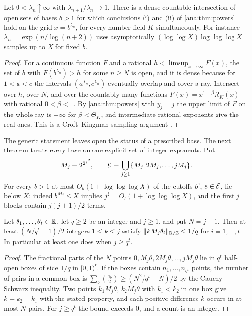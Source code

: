 \begin{proposition}\label{ana:prop:generic}
Let $0<\lambda_n\uparrow\infty$ with $\lambda_{n+1}/\lambda_n\to1$. There is a dense countable
intersection of open sets of bases $b>1$ for which conclusions \textup{(i)} and
\textup{(ii)} of \cref{ana:thm:powers} hold on the grid $x=b^{\lambda_n}$, for every number
field $K$ simultaneously. For instance $\lambda_n=\exp(n/\log(n+2))$ uses asymptotically
$(\log\log X)\log\log\log X$ samples up to $X$ for fixed $b$.
\end{proposition}

\begin{proof}
For a continuous function $F$ and a rational $h<\limsup_{x\to\infty}F(x)$, the set of $b$ with
$F(b^{\lambda_n})>h$ for some $n\ge N$ is open, and it is dense because for $1<a<c$ the
intervals $(a^{\lambda_n},c^{\lambda_n})$ eventually overlap and cover a ray. Intersect over
$h$, over $N$, and over the countably many functions $F(x)=x^{1-\beta}R_K(x)$ with rational
$0<\beta<1$. By \cref{ana:thm:powers} with $y_j=j$ the upper limit of $F$ on the whole ray is
$+\infty$ for $\beta<\Theta_K$, and intermediate rational exponents give the real ones. This
is a Croft--Kingman sampling argument \cite{BinghamOstaszewskiKingman}.
\end{proof}

The generic statement leaves open the status of a prescribed base. The next theorem treats
every base on one explicit set of integer exponents. Put
\[
 M_j=2^{2^{j^2}},\qquad\mathcal{E}=\bigcup_{j\ge1}\{M_j,2M_j,\dots,jM_j\}.
\]
For every $b>1$ at most $O_b(1+\log\log\log X)$ of the cutoffs $b^e$, $e\in\mathcal{E}$, lie below
$X$: indeed $b^{M_j}\le X$ implies $j^2=O_b(1+\log\log\log X)$, and the first $j$ blocks
contain $j(j+1)/2$ terms.

\begin{lemma}\label{ana:lem:boxcount}
Let $\theta_1,\dots,\theta_t\in\mathbb{R}$, let $q\ge2$ be an integer and $j\ge1$, and put $N=j+1$.
Then at least $(N/q^t-1)/2$ integers $1\le k\le j$ satisfy $\lVert kM_j\theta_i\rVert_{\mathbb{R}/\mathbb{Z}}\le1/q$ for
$i=1,\dots,t$. In particular at least one does when $j\ge q^t$.
\end{lemma}

\begin{proof}
The fractional parts of the $N$ points $0,M_j\theta,2M_j\theta,\dots,jM_j\theta$ lie in $q^t$
half-open boxes of side $1/q$ in $[0,1)^t$. If the boxes contain $n_1,\dots,n_{q^t}$ points, the
number of pairs in a common box is $\sum_b\binom{n_b}2\ge(N^2/q^t-N)/2$ by the Cauchy--Schwarz
inequality. Two points $k_1M_j\theta$, $k_2M_j\theta$ with $k_1<k_2$ in one box give
$k=k_2-k_1$ with the stated property, and each positive difference $k$ occurs in at most $N$
pairs. For $j\ge q^t$ the bound exceeds $0$, and a count is an integer.
\end{proof}

